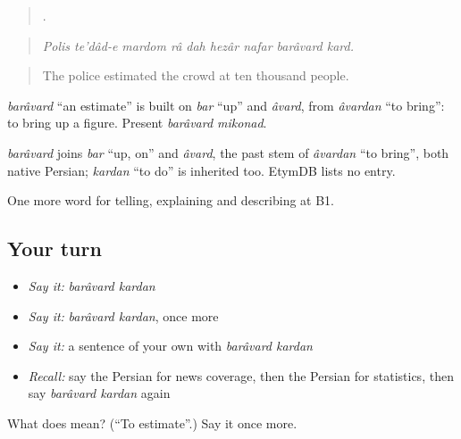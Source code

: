 \begin{quote}
        .
\end{quote}

\begin{quote}
\emph{Polis te'dâd-e mardom râ dah hezâr nafar barâvard kard.}
\end{quote}

\begin{quote}
The police estimated the crowd at ten thousand people.
\end{quote}

\emph{barâvard} \textquotedblleft{}an estimate\textquotedblright{} is built on \emph{bar} \textquotedblleft{}up\textquotedblright{} and \emph{âvard}, from \emph{âvardan} \textquotedblleft{}to bring\textquotedblright{}: to bring up a figure. Present \emph{barâvard mikonad}.

\begin{cousinweb}
\emph{barâvard} joins \emph{bar} \textquotedblleft{}up, on\textquotedblright{} and \emph{âvard}, the past stem of \emph{âvardan} \textquotedblleft{}to bring\textquotedblright{}, both native Persian; \emph{kardan} \textquotedblleft{}to do\textquotedblright{} is inherited too. EtymDB lists no entry.
\end{cousinweb}

\begin{grammarlens}[title={What you've built}]
One more word for telling, explaining and describing at B1.
\end{grammarlens}

\subsection*{Your turn}
\begin{itemize}
\raggedright
  \item \emph{Say it:} \emph{barâvard kardan}
  \item \emph{Say it:} \emph{barâvard kardan}, once more
  \item \emph{Say it:} a sentence of your own with \emph{barâvard kardan}
  \item \emph{Recall:} say the Persian for news coverage, then the Persian for statistics, then say \emph{barâvard kardan} again
\end{itemize}

\begin{tcolorbox}[breakable,colback=teal!4,colframe=teal!35!black,title={Before you move on}]
What does   mean? (\textquotedblleft{}To estimate\textquotedblright{}.) Say it once more.
\end{tcolorbox}
